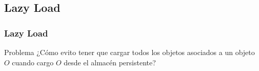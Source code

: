 \documentclass[a4paper,slidestop,xcolor=pst,blue]{beamer}
\begin{document}
%
%

\subsection{Lazy Load}

\begin{frame}[c]
    \frametitle{Lazy Load}
    \begin{block}{Problema}
        ¿Cómo evito tener que cargar todos los objetos asociados a un objeto $O$ cuando cargo $O$ desde el almacén persistente?
    \end{block}
\end{frame}
\end{document}
